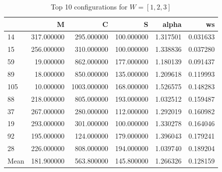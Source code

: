 \begin{frame}
    \begin{table}
        \caption{Top 10 configurations for \(W=[1, 2, 3]\)}
    \begin{tabular}{lrrrrr}
    \toprule
     & M & C & S & alpha & ws \\
    \midrule
    14 & 317.000000 & 295.000000 & 100.000000 & 1.317501 & 0.031633 \\
    15 & 256.000000 & 310.000000 & 100.000000 & 1.338836 & 0.037280 \\
    59 & 19.000000 & 862.000000 & 177.000000 & 1.180139 & 0.091437 \\
    89 & 18.000000 & 850.000000 & 135.000000 & 1.209618 & 0.119993 \\
    105 & 10.000000 & 1003.000000 & 168.000000 & 1.526575 & 0.148283 \\
    88 & 218.000000 & 805.000000 & 193.000000 & 1.032512 & 0.159487 \\
    37 & 267.000000 & 280.000000 & 112.000000 & 1.292019 & 0.160982 \\
    19 & 293.000000 & 301.000000 & 100.000000 & 1.330278 & 0.164046 \\
    92 & 195.000000 & 124.000000 & 179.000000 & 1.396043 & 0.179241 \\
    28 & 226.000000 & 808.000000 & 194.000000 & 1.039740 & 0.189204 \\
    \midrule
    Mean & 181.900000 & 563.800000 & 145.800000 & 1.266326 & 0.128159 \\
    \bottomrule
    \end{tabular}
    \end{table}
\end{frame}

